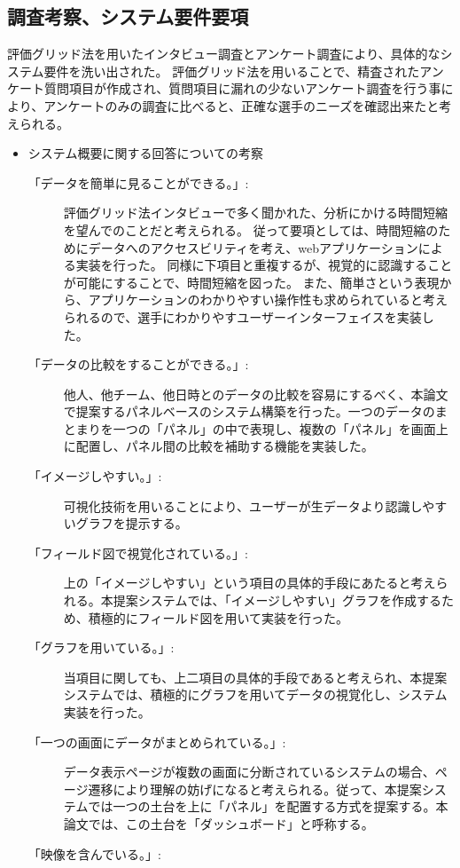 \documentclass[sotsuron]{kuee}
\begin{document}
\subsection{調査考察、システム要件要項}
評価グリッド法を用いたインタビュー調査とアンケート調査により、具体的なシステム要件を洗い出された。
評価グリッド法を用いることで、精査されたアンケート質問項目が作成され、質問項目に漏れの少ないアンケート調査を行う事により、アンケートのみの調査に比べると、正確な選手のニーズを確認出来たと考えられる。
\begin{itemize}
	\item システム概要に関する回答についての考察
		\begin{description}
			\item [「データを簡単に見ることができる。」:]
			評価グリッド法インタビューで多く聞かれた、分析にかける時間短縮を望んでのことだと考えられる。
			従って要項としては、時間短縮のためにデータへのアクセスビリティを考え、webアプリケーションによる実装を行った。
			同様に下項目と重複するが、視覚的に認識することが可能にすることで、時間短縮を図った。
			また、簡単さという表現から、アプリケーションのわかりやすい操作性も求められていると考えられるので、選手にわかりやすユーザーインターフェイスを実装した。
			\item [「データの比較をすることができる。」:]
			他人、他チーム、他日時とのデータの比較を容易にするべく、本論文で提案するパネルベースのシステム構築を行った。一つのデータのまとまりを一つの「パネル」の中で表現し、複数の「パネル」を画面上に配置し、パネル間の比較を補助する機能を実装した。
			\item [「イメージしやすい。」:]
			可視化技術を用いることにより、ユーザーが生データより認識しやすいグラフを提示する。
			\item [「フィールド図で視覚化されている。」:]
			上の「イメージしやすい」という項目の具体的手段にあたると考えられる。本提案システムでは、「イメージしやすい」グラフを作成するため、積極的にフィールド図を用いて実装を行った。
			\item [「グラフを用いている。」:]
			当項目に関しても、上二項目の具体的手段であると考えられ、本提案システムでは、積極的にグラフを用いてデータの視覚化し、システム実装を行った。
			\item [「一つの画面にデータがまとめられている。」:]
			データ表示ページが複数の画面に分断されているシステムの場合、ページ遷移により理解の妨げになると考えられる。従って、本提案システムでは一つの土台を上に「パネル」を配置する方式を提案する。本論文では、この土台を「ダッシュボード」と呼称する。
			\item [「映像を含んでいる。」:]

\end{description}
\end{itemize}
\end{document}
